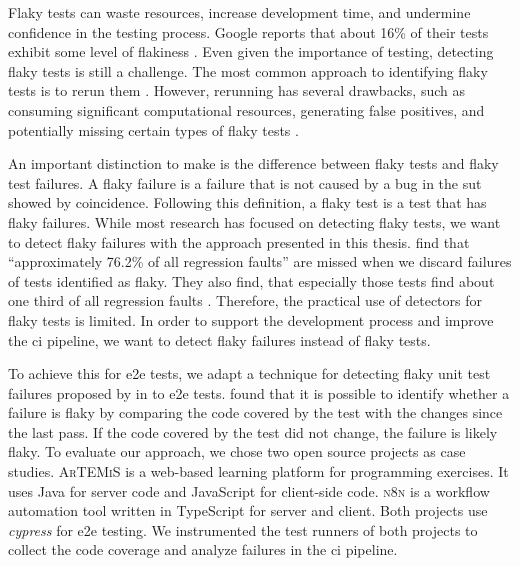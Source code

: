 Flaky tests can waste resources, increase development time, and undermine confidence in the testing process.
Google reports that about 16\% of their tests exhibit some level of flakiness \autocite{micco_state_2017}.
Even given the importance of testing, detecting flaky tests is still a challenge.
The most common approach to identifying flaky tests is to rerun them \autocite{lam_idflakies_2019, lam_understanding_2020}.
However, rerunning has several drawbacks, such as consuming significant computational resources, generating false positives, and potentially missing certain types of flaky tests \autocite{bell_deflaker_2018, luo_empirical_2014}.

An important distinction to make is the difference between flaky tests and flaky test failures.
A flaky failure is a failure that is not caused by a bug in the \ac{sut} showed by coincidence.
Following this definition, a flaky test is a test that has flaky failures.
While most research has focused on detecting flaky tests, we want to detect flaky failures with the approach presented in this thesis.
 find that \enquote{approximately 76.2\% of all regression faults} \autocite{haben_importance_2023} are missed when we discard failures of tests identified as flaky.
They also find, that especially those tests find about one third of all regression faults \autocite{haben_importance_2023}.
Therefore, the practical use of detectors for flaky tests is limited.
In order to support the development process and improve the \ac{ci} pipeline, we want to detect flaky failures instead of flaky tests.

To achieve this for \ac{e2e} tests, we adapt a technique for detecting flaky unit test failures proposed by \citeauthor*{bell_deflaker_2018} in  \autocite{bell_deflaker_2018} to \ac{e2e} tests.
 found that it is possible to identify whether a failure is flaky by comparing the code covered by the test with the changes since the last pass.
If the code covered by the test did not change, the failure is likely flaky.
To evaluate our approach, we chose two open source projects as case studies.
\textsc{ArTEMiS} \autocite{krusche_artemis_2018} is a web-based learning platform for programming exercises.
It uses Java for server code and JavaScript for client-side code.
\textsc{n8n} \autocite{noauthor_n8n_2023} is a workflow automation tool written in TypeScript for server and client.
Both projects use \textit{cypress} \autocite{noauthor_cypress-iocypress_2023} for \ac{e2e} testing.
We instrumented the test runners of both projects to collect the code coverage and analyze failures in the \ac{ci} pipeline.


